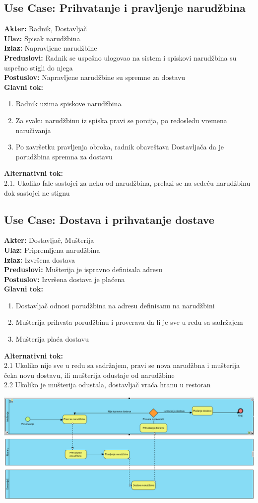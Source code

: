 \documentclass{article}
\begin{document}
\subsection{\textbf{Use Case}: Prihvatanje i pravljenje narudžbina}
\textbf{Akter:} Radnik, Dostavljač\\
\textbf{Ulaz:} Spisak narudžbina\\
\textbf{Izlaz:} Napravljene narudžbine\\
\textbf{Preduslovi:} Radnik se uspešno ulogovao na sistem i spiskovi narudžbina su uspešno stigli do njega\\
\textbf{Postuslov:}  Napravljene narudžbine su spremne za dostavu\\
\textbf{Glavni tok:}
\begin{enumerate}
\item Radnik uzima spiskove narudžbina
\item Za svaku narudžbinu iz spiska pravi se porcija, po redosledu vremena naručivanja
\item Po završetku pravljenja obroka, radnik obaveštava Dostavljača da je porudžbina spremna za dostavu 
\end{enumerate}
\textbf{Alternativni tok:}\\
       2.1. Ukoliko  fale sastojci za neku od narudžbina, prelazi se na sedeću narudžbinu dok sastojci ne stignu\\
       
       
\subsection{\textbf{Use Case}: Dostava i prihvatanje dostave}
\textbf{Akter:} Dostavljač, Mušterija\\
\textbf{Ulaz:} Pripremljena narudžbina\\
\textbf{Izlaz:} Izvršena dostava\\
\textbf{Preduslovi:} Mušterija je ispravno definisala adresu\\
\textbf{Postuslov:}  Izvršena dostava je plaćena\\
\textbf{Glavni tok:}
\begin{enumerate}
\item Dostavljač odnosi porudžbina na adresu definisanu na narudžbini
\item Mušterija prihvata porudžbinu i proverava da li je sve u redu sa sadržajem
\item Mušterija plaća dostavu
\end{enumerate}
\textbf{Alternativni tok:}\\
       2.1 Ukoliko nije sve u redu sa sadržajem, pravi se nova narudžbna i mušterija čeka novu dostavu, ili mušterija odustaje od narudžbine\\
       2.2 Ukoliko je mušterija odustala, dostavljač vraća hranu u restoran

\includegraphics[width=\textwidth]{dostavaBPMN.png}
\end{document}
